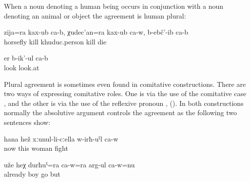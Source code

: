 When a noun denoting a human being occurs in conjunction with a noun denoting an animal or object the agreement is human plural:
%
\begin{exe}
	\ex	\label{ex:‎(The Sanzhi man shot) and killed the horsefly and he killed the Xuduc man, and (they both) died}
	\gll	zija=ra	kax-ub	ca-b,	χudec'an=ra	kax-ub	ca-w,	b-ebč'-ib	ca-b\\
		horsefly	kill		khuduc.person	kill	die	\\
	\glt	{}

	\ex	\label{ex:(The boy and the dog) are looking}
	\gll	er	b-ik'-ul	ca-b\\
		look	look.at	\\
	\glt	{}
\end{exe}

Plural agreement is sometimes even found in comitative constructions. There are two ways of expressing comitative roles. One is via the use of the comitative case ,  and the other is via the use of the reflexive pronoun ,  (). In both constructions normally the absolutive argument controls the agreement as the following two sentences show:
%
\begin{exe}
	\ex	\label{ex:Now he is fighting with this wife}
	\gll	hana	hež	xːunul-li-cːella	w-irħ-uˁl	ca-w\\
		now	this	woman	fight	\\
	\glt	{}

	\ex	\label{ex:He is already walking with this son}
	\gll	uže	heχ	durħuˁ=ra	ca-w=ra	arg-ul	ca-w=nu\\
		already		boy		go	but\\
	\glt	{}
\end{exe}

